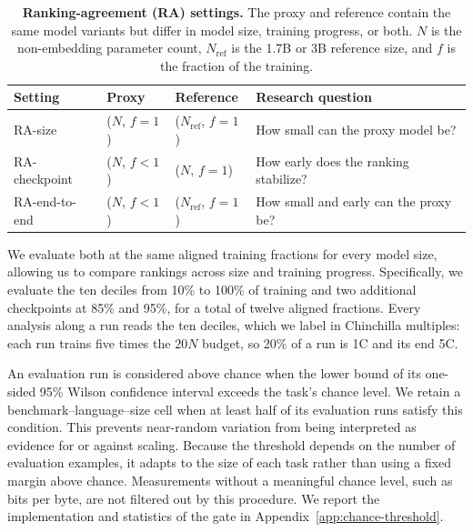 \begin{table}[h!]
    \centering
    \begin{tabular}{llll}
        \toprule
        Setting & Proxy & Reference & Research question \\
        \midrule
        RA-size
            & ($N$, $f=1$)
            & ($N_{\mathrm{ref}}$, $f=1$)
            & How small can the proxy model be? \\
        RA-checkpoint
            & ($N$, $f<1$)
            & ($N$, \quad $f=1$)
            & How early does the ranking stabilize? \\
        RA-end-to-end
            & ($N$, $f<1$)
            & ($N_{\mathrm{ref}}$, $f=1$)
            & How small and early can the proxy be? \\
        \bottomrule
    \end{tabular}
        \caption{\textbf{Ranking-agreement (RA) settings.} The proxy and reference contain the same model variants but differ in model size, training progress, or both. $N$ is the non-embedding parameter count, $N_{\mathrm{ref}}$ is the 1.7B or 3B reference size, and $f$ is the fraction of the training.}
    \label{tab:ra_defs}
\end{table}



We evaluate both at the same aligned training fractions for every model size, allowing us to compare rankings across size and training progress.
Specifically, we evaluate the ten deciles from 10\% to 100\% of training and two additional checkpoints at 85\% and 95\%, for a total of twelve aligned fractions. Every analysis along a run reads the ten deciles, which we label in Chinchilla multiples: each run trains five times the $20N$ budget, so 20\% of a run is 1C and its end 5C. %




An evaluation run is considered above chance when the lower bound of its one-sided 95\% Wilson confidence interval exceeds the task's chance level.
We retain a benchmark--language--size cell when at least half of its evaluation runs satisfy this condition.
This prevents near-random variation from being interpreted as evidence for or against scaling.
Because the threshold depends on the number of evaluation examples, it adapts to the size of each task rather than using a fixed margin above chance.
Measurements without a meaningful chance level, such as bits per byte, are not filtered out by this procedure.
We report the implementation and statistics of the gate in Appendix~\ref{app:chance-threshold}.

